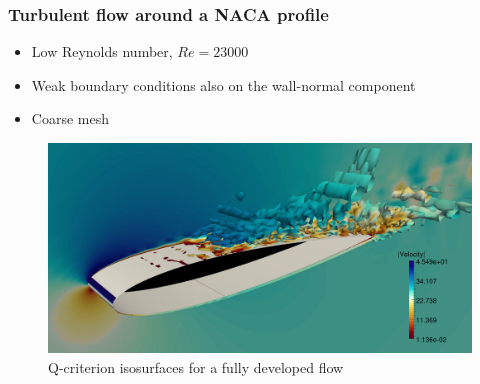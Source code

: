 \begin{frame}[t]
\frametitle{Turbulent flow around a NACA profile}
\begin{itemize}
\item Low Reynolds number, $ Re = 23000 $
\item Weak boundary conditions \alert{also on the wall-normal component}
\item Coarse mesh
\end{itemize}
\begin{figure}[h]
  \centering
  \includegraphics[clip=true,trim=1cm 4cm 2cm 6cm,width=1.0\textwidth]{Figures/Q_criterion_3d}
  \caption{Q-criterion isosurfaces for a fully developed flow}
  \label{fig-TCF_isovorticity}
\end{figure}
\end{frame}